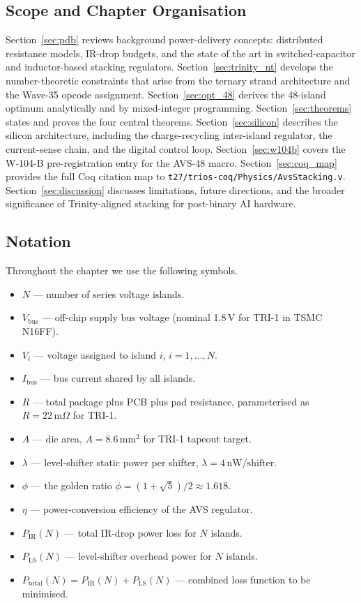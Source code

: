 \subsection*{Scope and Chapter Organisation}

Section~\ref{sec:pdb} reviews background power-delivery concepts:
distributed resistance models, IR-drop budgets, and the state of the art
in switched-capacitor and inductor-based stacking regulators.
Section~\ref{sec:trinity_nt} develops the number-theoretic constraints
that arise from the ternary strand architecture and the Wave-35 opcode
assignment.  Section~\ref{sec:opt_48} derives the 48-island optimum
analytically and by mixed-integer programming.
Section~\ref{sec:theorems} states and proves the four central theorems.
Section~\ref{sec:silicon} describes the silicon architecture, including
the charge-recycling inter-island regulator, the current-sense chain,
and the digital control loop.  Section~\ref{sec:w104b} covers the W-104-B
pre-registration entry for the AVS-48 macro.
Section~\ref{sec:coq_map} provides the full Coq citation map to
\texttt{t27/trios-coq/Physics/AvsStacking.v}.
Section~\ref{sec:discussion} discusses limitations, future directions,
and the broader significance of Trinity-aligned stacking for post-binary
AI hardware.

\subsection*{Notation}

Throughout the chapter we use the following symbols.

\begin{itemize}
  \item $N$ — number of series voltage islands.
  \item $V_{\mathrm{bus}}$ — off-chip supply bus voltage (nominal 1.8\,V for
        TRI-1 in TSMC N16FF).
  \item $V_i$ — voltage assigned to island $i$, $i = 1, \ldots, N$.
  \item $I_{\mathrm{bus}}$ — bus current shared by all islands.
  \item $R$ — total package plus PCB plus pad resistance, parameterised as
        $R = 22\,\mathrm{m}\Omega$ for TRI-1.
  \item $A$ — die area, $A = 8.6\,\mathrm{mm}^2$ for TRI-1 tapeout target.
  \item $\lambda$ — level-shifter static power per shifter,
        $\lambda = 4\,\mathrm{nW/shifter}$.
  \item $\phi$ — the golden ratio $\phi = (1+\sqrt{5})/2 \approx 1.618$.
  \item $\eta$ — power-conversion efficiency of the AVS regulator.
  \item $P_{\mathrm{IR}}(N)$ — total IR-drop power loss for $N$ islands.
  \item $P_{\mathrm{LS}}(N)$ — level-shifter overhead power for $N$ islands.
  \item $P_{\mathrm{total}}(N) = P_{\mathrm{IR}}(N) + P_{\mathrm{LS}}(N)$
        — combined loss function to be minimised.
\end{itemize}

